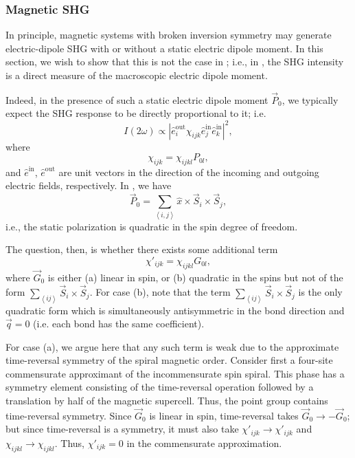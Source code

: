 \subsubsection{Magnetic SHG}\label{cubr2-sup:magshg}

In principle, magnetic systems with broken inversion symmetry may generate electric-dipole SHG with or without a static electric dipole moment.
In this section, we wish to show that this is not the case in ; i.e., in , the SHG intensity is a direct measure of the macroscopic electric dipole moment.

Indeed, in the presence of such a static electric dipole moment $\vec{P}_0$, we typically expect the SHG response to be directly proportional to it; i.e.
\begin{equation}\label{cubr2-eq:shgintensityequation}
I(2\omega) \propto |\hat{e}^\mathrm{out}_i \chi_{ijk} \hat{e}^\mathrm{in}_j \hat{e}^\mathrm{in}_k|^2,
\end{equation}
where
\begin{equation}\label{cubr2-eq:susceptibilityshortform}
\chi_{ijk} = \chi_{ijkl} P_{0l},
\end{equation}
and $\hat{e}^\mathrm{in}$, $\hat{e}^\mathrm{out}$ are unit vectors in the direction of the incoming and outgoing electric fields, respectively.
In , we have  
\begin{equation}
\vec{P}_0 = \sum\limits_{\left<i, j\right>} \hat{x} \times \vec{S}_i \times \vec{S}_j,
\end{equation}
i.e., the static polarization is quadratic in the spin degree of freedom.

The question, then, is whether there exists some additional term
\begin{equation}
\chi'_{ijk} = \chi_{ijkl} G_{0l},
\end{equation}
where $\vec{G}_0$ is either (a) linear in spin, or (b) quadratic in the spins but not of the form $\sum_{\left<ij\right>}\vec{S}_i\times\vec{S}_j$.
For case (b), note that the term $\sum_{\left<ij\right>}\vec{S}_i\times\vec{S}_j$ is the only quadratic form which is simultaneously antisymmetric in the bond direction and $\vec{q}=0$ (i.e. each bond has the same coefficient).

For case (a), we argue here that any such term is weak due to the approximate time-reversal symmetry of the spiral magnetic order.
Consider first a four-site commensurate approximant of the incommensurate spin spiral.
This phase has a symmetry element consisting of the time-reversal operation followed by a translation by half of the magnetic supercell.
Thus, the point group contains time-reversal symmetry.
Since $\vec{G}_0$ is linear in spin, time-reversal takes $\vec{G}_0\rightarrow-\vec{G}_0$; but since time-reversal is a symmetry, it must also take $\chi'_{ijk}\rightarrow\chi'_{ijk}$ and $\chi_{ijkl}\rightarrow\chi_{ijkl}$.
Thus, $\chi'_{ijk}=0$ in the commensurate approximation.

